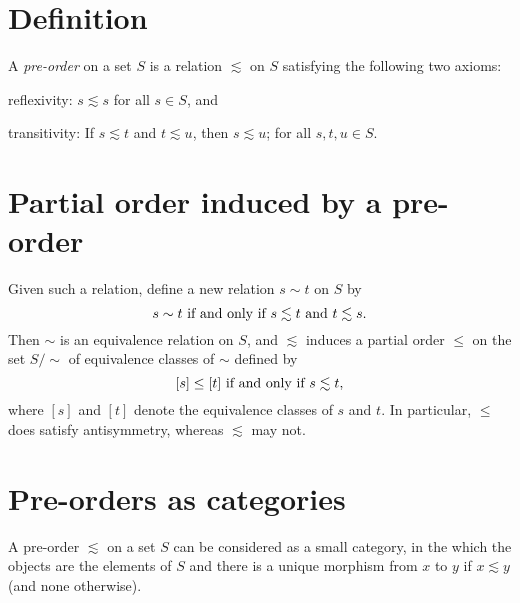 \documentclass[12pt]{article}
\begin{document}

\section*{Definition}

A \emph{pre-order} on a set $S$ is a relation $\lesssim$ on $S$ satisfying the following two axioms:
\begin{description}
\item reflexivity: $s \lesssim s$ for all $s \in S$, and
\item transitivity: If $s \lesssim t$ and $t \lesssim u$, then $s \lesssim u$; for all $s,t,u \in S$. 
\end{description}

\section*{Partial order induced by a pre-order}

Given such a relation, define a new relation $s\sim t$ on $S$ by
\[
s\sim t \hbox{ if and only if } s\lesssim t \hbox{ and } t \lesssim s.
\]
Then $\sim$ is an equivalence relation on $S$, and $\lesssim$ induces a partial order $\leq$ on the set $S/\sim$ of equivalence classes of $\sim$ defined by
\[
[s] \leq [t] \hbox{ if and only if } s \lesssim t,
\]
where $[s]$ and $[t]$ denote the equivalence classes of $s$ and $t$. In particular, $\leq$ does satisfy antisymmetry, whereas $\lesssim$ may not.

\section*{Pre-orders as categories}

A pre-order $\lesssim$ on a set $S$ can be considered as a small category, in the which the objects are the elements of $S$ and there is a unique morphism from $x$ to $y$ if $x\lesssim y$ (and none otherwise).

\end{document}
